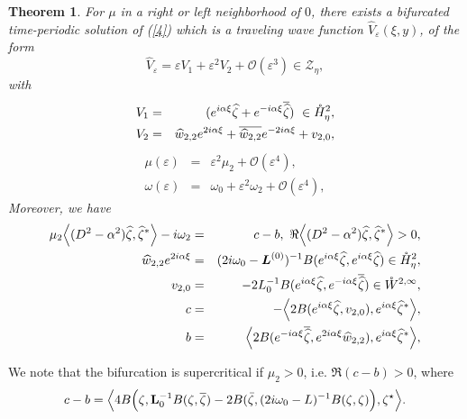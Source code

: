 \documentclass[11pt]{article}
\newtheorem{theorem}{Theorem}
\begin{document}
\begin{theorem} \label{maintheo2}
For $\mu$ in a right or left neighborhood of $0$, there exists a bifurcated time-periodic solution of (\ref{4}) which is a traveling wave function $\widehat{V}_{\varepsilon }(\xi,y)$,
of the form
\begin{equation*}
\widehat{V}_{\varepsilon }=\varepsilon V_{1}+\varepsilon ^{2}V_{2}+\mathcal{O%
}(\varepsilon ^{3})\in \mathcal{Z}_{\eta},
\end{equation*}%
with%
\begin{eqnarray*}
V_{1} &=&(e^{i\alpha \xi }\widehat{\zeta }+e^{-i\alpha \xi }\overline{%
\widehat{\zeta }})\text{ }\in \mathring{H}_{\eta}^{2}, \\
V_{2} &=&\widehat{w}_{2,2}e^{2i\alpha \xi }+\overline{\widehat{w}_{2,2}}%
e^{-2i\alpha \xi }+v_{2,0},
\end{eqnarray*}%
\begin{eqnarray*}
\mu (\varepsilon ) &=&\varepsilon ^{2}\mu _{2}+\mathcal{O}(\varepsilon ^{4}),
\\
\omega (\varepsilon ) &=&\omega _{0}+\varepsilon ^{2}\omega _{2}+\mathcal{O}%
(\varepsilon ^{4}),
\end{eqnarray*}%
Moreover, we have 
\begin{eqnarray*}
\mu _{2} \Bigl\langle (D^{2}-\alpha ^{2})\widehat{\zeta },\widehat{\zeta }^{\ast
} \Bigr\rangle -i\omega _{2} 
&=&c-b,\text{ }\Re \Bigl\langle (D^{2}-\alpha ^{2})%
\widehat{\zeta },\widehat{\zeta }^{\ast } \Bigr\rangle >0, \\
\widehat{w}_{2,2}e^{2i\alpha \xi } &=&(2i\omega _{0}-\boldsymbol{L}^{(0)}%
)^{-1}B(e^{i\alpha \xi }\widehat{\zeta },e^{i\alpha \xi }\widehat{\zeta }%
)\in \mathring{H}_{\eta}^{2}, \\
v_{2,0} &=&-2L_{0}^{-1}B(e^{i\alpha \xi }\widehat{\zeta },e^{-i\alpha \xi }%
\overline{\widehat{\zeta }})\in \mathring{W}^{2,\infty }, \\
c &=&-\Bigl\langle 2B(e^{i\alpha \xi }\widehat{\zeta },v_{2,0}),e^{i\alpha \xi }%
\widehat{\zeta }^{\ast } \Bigr\rangle , \\
b &=& \Bigl\langle 2B(e^{-i\alpha \xi }\overline{\widehat{\zeta }},e^{2i\alpha \xi
}\widehat{w}_{2,2}),e^{i\alpha \xi }\widehat{\zeta }^{\ast } \Bigr\rangle ,
\end{eqnarray*}%
\end{theorem}

We note that the bifurcation is supercritical if $\mu_2>0$, i.e. $\Re (c-b)>0$, where
$$
c - b = \Bigl\langle 4 B \Bigl( \zeta, {\bf L}_{0}^{-1} B(\zeta,\overline{\zeta})
- 2 B(\bar \zeta, (2 i \omega_0 - L)^{-1} B(\zeta,\zeta) \Bigr), \zeta^\star \Bigr\rangle .
$$
\end{document}

